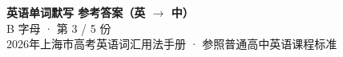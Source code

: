\documentclass[10pt,a4paper]{article}
\begin{document}
\pagestyle{plain}

\begin{center}
{\LARGE\bfseries 英语单词默写 \quad 参考答案（英 $\to$ 中）}\\[0.22em]
{\large B 字母 · 第 3 / 5 份}\\[0.18em]
{\small 2026年上海市高考英语词汇用法手册 · 参照普通高中英语课程标准}
\end{center}

\vspace{0.2em}
\noindent{\color{rulegray}\rule{\textwidth}{0.8pt}}

\vspace{0.35em}

\vspace{0.25em}
\renewcommand{\arraystretch}{1.32}
\end{document}
